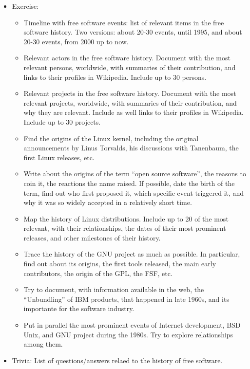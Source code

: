 \documentclass[a4paper]{article}
\begin{document}
\begin{itemize}
\item Exercise:
  \begin{itemize}
  \item Timeline with free software events: list of relevant items in the free software history. Two versions: about 20-30 events, until 1995, and about 20-30 events, from 2000 up to now.
  \item Relevant actors in the free software history. Document with the most relevant persons, worldwide, with summaries of their contribution, and links to their profiles in Wikipedia. Include up to 30 persons.
  \item Relevant projects in the free software history. Document with the most relevant projects, worldwide, with summaries of their contribution, and why they are relevant. Include as well links to their profiles in Wikipedia. Include up to 30 projects.
  \item Find the origins of the Linux kernel, including the original announcements by Linus Torvalds, his discussions with Tanenbaum, the first Linux releases, etc.
  \item Write about the origins of the term ``open source software'', the reasons to coin it, the reactions the name raised. If possible, date the birth of the term, find out who first proposed it, which specific event triggered it, and why it was so widely accepted in a relatively short time.
  \item Map the history of Linux distributions. Include up to 20 of the most relevant, with their relationships, the dates of their most prominent releases, and other milestones of their history.
  \item Trace the history of the GNU project as much as possible. In particular, find out about its origins, the first tools released, the main early contributors, the origin of the GPL, the FSF, etc.
  \item Try to document, with information available in the web, the ``Unbundling'' of IBM products, that happened in late 1960s, and its importante for the software industry.
  \item Put in parallel the most prominent events of Internet development, BSD Unix, and GNU project during the 1980s. Try to explore relationships among them.
  \end{itemize}

\item Trivia: List of questions/answers relaed to the history of free software.


\end{itemize}
\end{document}

